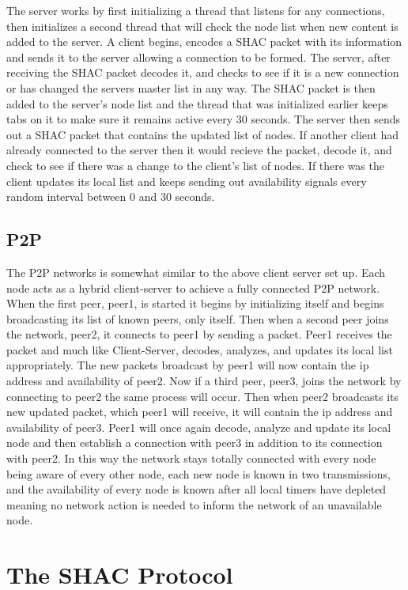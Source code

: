 \documentclass[11pt]{article}
\begin{document}
\begin{doublespace}
The server works by first initializing a thread that listens for any connections, then initializes a second thread that will check the node list when new content is added to the server. A client begins, encodes a SHAC packet with its information and sends it to the server allowing a connection to be formed. The server, after receiving the SHAC packet decodes it, and checks to see if it is a new connection or has changed the servers master list in any way. The SHAC packet is then added to the server's node list and the thread that was initialized earlier keeps tabs on it to make sure it remains active every 30 seconds. The server then sends out a SHAC packet that contains the updated list of nodes. If another client had already connected to the server then it would recieve the packet, decode it, and check to see if there was a change to the client's list of nodes. If there was the client updates its local list and keeps sending out availability signals every random interval between 0 and 30 seconds. 

\subsection{P2P}

The P2P networks is somewhat similar to the above client server set up. Each node acts as a hybrid client-server to achieve a fully connected P2P network. When the first peer, peer1, is started it begins by initializing itself and begins broadcasting its list of known peers, only itself. Then when a second peer joins the network, peer2, it connects to peer1 by sending a packet. Peer1 receives the packet and much like Client-Server, decodes, analyzes, and updates its local list appropriately. The new packets broadcast by peer1 will now contain the ip address and availability of peer2. Now if a third peer, peer3, joins the network by connecting to peer2 the same process will occur. Then when peer2 broadcasts its new updated packet, which peer1 will receive, it will contain the ip address and availability of peer3. Peer1 will once again decode, analyze and update its local node and then establish a connection with peer3 in addition to its connection with peer2. In this way the network stays totally connected with every node being aware of every other node, each new node is known in two transmissions, and the availability of every node is known after all local timers have depleted meaning no network action is needed to inform the network of an unavailable node.

\section{The SHAC Protocol}


\end{doublespace}
\end{document}
